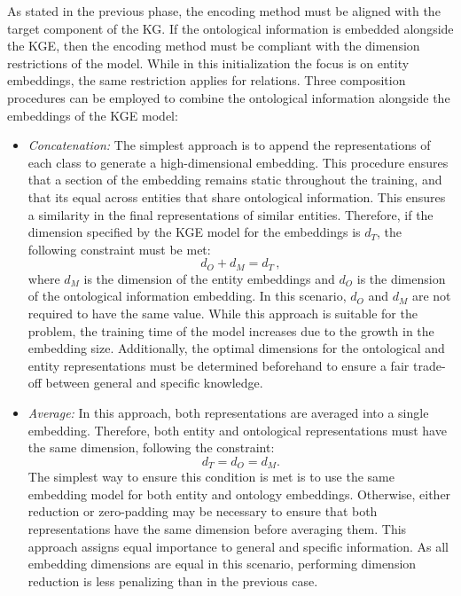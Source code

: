 As stated in the previous phase, the encoding method must be aligned with the target component of the KG. If the ontological information is embedded alongside the KGE, then the encoding method must be compliant with the dimension restrictions of the model. While in this initialization the focus is on entity embeddings, the same restriction applies for relations. Three composition procedures can be employed to combine the ontological information alongside the embeddings of the KGE model:
\begin{itemize}
    \item \textit{Concatenation:} The simplest approach is to append the representations of each class to generate a high-dimensional embedding. This procedure ensures that a section of the embedding remains static throughout the training, and that its equal across entities that share ontological information. This ensures a similarity in the final representations of similar entities. Therefore, if the dimension specified by the KGE model for the embeddings is $d_T$, the following constraint must be met:
    \begin{equation}
        d_O+d_M=d_T\,,
    \end{equation}
    where $d_M$ is the dimension of the entity embeddings and $d_O$ is the dimension of the ontological information embedding. In this scenario, $d_O$ and $d_M$ are not required to have the same value. While this approach is suitable for the problem, the training time of the model increases due to the growth in the embedding size. Additionally, the optimal dimensions for the ontological and entity representations must be determined beforehand to ensure a fair trade-off between general and specific knowledge.
    
    \item \textit{Average:} In this approach, both representations are averaged into a single embedding. Therefore, both entity and ontological representations must have the same dimension, following the constraint:
    \begin{equation}
        d_T = d_O = d_M.
    \end{equation}
    The simplest way to ensure this condition is met is to use the same embedding model for both entity and ontology embeddings. Otherwise, either reduction or zero-padding may be necessary to ensure that both representations have the same dimension before averaging them. This approach assigns equal importance to general and specific information. As all embedding dimensions are equal in this scenario, performing dimension reduction is less penalizing than in the previous case.
    

\end{itemize}
